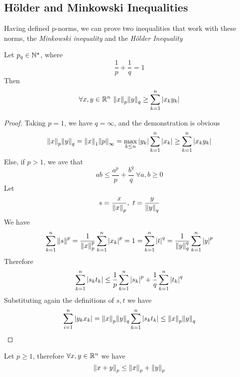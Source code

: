 \documentclass[../complete.tex]{subfiles}
\begin{document}
\subsection{Hölder and Minkowski Inequalities}
Having defined p-norms, we can prove two inequalities that work with these norms, the \textit{Minkowski inequality} and the \textit{Hölder Inequality}
\begin{thm}
	Let $p_q\in\mathbb{N}^\star$, where
	\begin{equation*}
		\frac{1}{p}+\frac{1}{q}=1
	\end{equation*}
	Then
	\begin{equation}
		\forall x,y\in\R^n\ \norm{x}_p\norm{y}_q\ge\sum_{k=1}^n\abs{x_ky_k}
		\label{eq:holderineq}
	\end{equation}
\end{thm}
\begin{proof}
	Taking $p=1$, we have $q=\infty$, and the demonstration is obvious
	\begin{equation*}
		\norm{x}_p\norm{y}_q=\norm{x}_1\norm{p}_\infty=\max_{k\le n}\abs{y_k}\sum_{k=1}^n\abs{x_k}\ge\sum_{k=1}^n\abs{x_ky_k}
	\end{equation*}
	Else, if $p>1$, we ave that
	\begin{equation*}
		ab\le\frac{a^p}{p}+\frac{b^q}{q}\ \forall a,b\ge0
	\end{equation*}
	Let
	\begin{equation*}
		s=\frac{x}{\norm{x}_p},\ t=\frac{y}{\norm{y}_q}
	\end{equation*}
	We have
	\begin{equation*}
		\sum_{k=1}^n\norm{s}^p=\frac{1}{\norm{x}_p^p}\sum_{k=1}^n\abs{x_k}^p=1=\sum_{k=1}^n\abs{t}^q=\frac{1}{\norm{y}_q^q}\sum_{k=1}^n\abs{y}^p
	\end{equation*}
	Therefore
	\begin{equation*}
		\sum_{k=1}^n\abs{s_kt_k}\le\frac{1}{p}\sum_{k=1}^n\abs{s_k}^p+\frac{1}{q}\sum_{k=1}^n\abs{t_k}^q
	\end{equation*}
	Substituting again the definitions of $s,t$ we have
	\begin{equation*}
		\sum_{i=1}^n\abs{y_kx_k}=\norm{x}_p\norm{y}_q\sum_{k=1}^n\abs{s_kt_k}\le\norm{x}_p\norm{y}_q
	\end{equation*}
\end{proof}
\begin{thm}
	Let $p\ge1$, therefore $\forall x,y\in\mathbb{R}^n$ we have
	\begin{equation}
		\norm{x+y}_p\le\norm{x}_p+\norm{y}_p
		\label{eq:minkowskiineq}
	\end{equation}
\end{thm}
\end{document}
